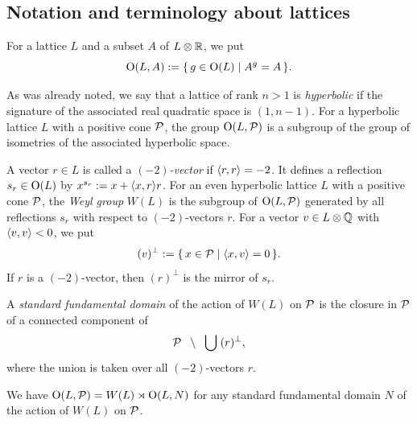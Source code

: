 \documentclass{amsart} %
\begin{document}
\subsection{Notation and terminology about lattices}\label{subsec:notationlat}
%
For a lattice $L$ and a subset $A$ of $L\otimes \mathord{\mathbb{R}}$,
we put
\[
\mathord{\mathrm{O}}(L, A):=\{\,{g\in \mathord{\mathrm{O}}(L)}\mid {A^g=A} \,\}.
\]
\par
As was already noted,
we say that a lattice of rank $n>1$ is \emph{hyperbolic}
if the signature of the associated real quadratic space is $(1, n-1)$.
For a hyperbolic lattice $L$ with a positive cone $\mathord{\mathcal{P}}$,
the group
$\mathord{\mathrm{O}}(L, \mathord{\mathcal{P}})$ is a subgroup of the group of isometries of the associated hyperbolic space.
\par 
A vector $r\in L$ is called a \emph{$(-2)$-vector} if $\langle r, r \rangle=-2$.
It defines a reflection 
$s_r\in \mathord{\mathrm{O}}(L)$ by $x^{s_r}:=x+\langle x, r \rangle r$.
For an even hyperbolic lattice $L$ with a positive cone $\mathord{\mathcal{P}}$,
 the \emph{Weyl group} $W(L)$
is the subgroup of $\mathord{\mathrm{O}}(L, \mathord{\mathcal{P}})$
generated by all reflections $s_r$ with respect to $(-2)$-vectors $r$.
For a vector $v \in L\otimes\mathord{\mathbb{Q}}$ with $\langle v, v \rangle<0$,
we put 
\[
(v)^{\perp}:=\{\,{x\in \mathord{\mathcal{P}}}\mid {\langle x, v \rangle=0} \,\}.
\]
If $r$ is a $(-2)$-vector, then $(r)^\perp$ is the mirror of $s_r$.
%
\begin{definition}
A \emph{standard fundamental domain} of the action of $W(L)$ on $\mathord{\mathcal{P}}$
is the closure in $ \mathord{\mathcal{P}}$ of a connected component of 
\[
\mathord{\mathcal{P}}\;\;\setminus \;\;\bigcup\; (r)^{\perp}, 
\]
where the union is taken over all $(-2)$-vectors $r$.
\end{definition}
%
We have $\mathord{\mathrm{O}}(L, \mathord{\mathcal{P}})=W(L)\rtimes \mathord{\mathrm{O}}(L, N)$
for any standard fundamental domain $N$ of the action of $W(L)$ on $\mathord{\mathcal{P}}$.
%
\end{document}

